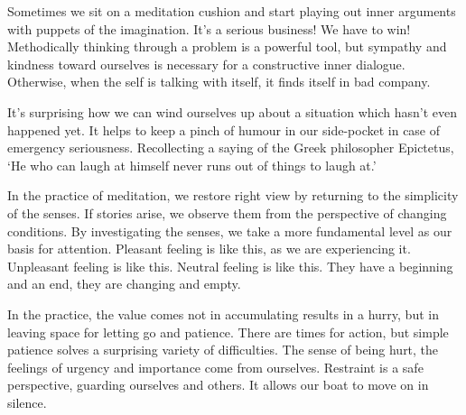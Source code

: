 Sometimes we sit on a meditation cushion and start playing out inner
arguments with puppets of the imagination. It's a serious business! We
have to win! Methodically thinking through a problem is a powerful tool,
but sympathy and kindness toward ourselves is necessary for a
constructive inner dialogue. Otherwise, when the self is talking with
itself, it finds itself in bad company.


It's surprising how we can wind ourselves up about a situation which
hasn't even happened yet. It helps to keep a pinch of humour in our
side-pocket in case of emergency seriousness. Recollecting a saying of
the Greek philosopher Epictetus, `He who can laugh at himself never runs
out of things to laugh at.'


In the practice of meditation, we restore right view by returning to the
simplicity of the senses. If stories arise, we observe them from the
perspective of changing conditions. By investigating the senses, we take
a more fundamental level as our basis for attention. Pleasant feeling is
like this, as we are experiencing it. Unpleasant feeling is like this.
Neutral feeling is like this. They have a beginning and an end, they are
changing and empty.

In the practice, the value comes not in accumulating results in a hurry,
but in leaving space for letting go and patience. There are times for
action, but simple patience solves a surprising variety of difficulties.
The sense of being hurt, the feelings of urgency and importance come
from ourselves. Restraint is a safe perspective, guarding ourselves and
others. It allows our boat to move on in silence.
